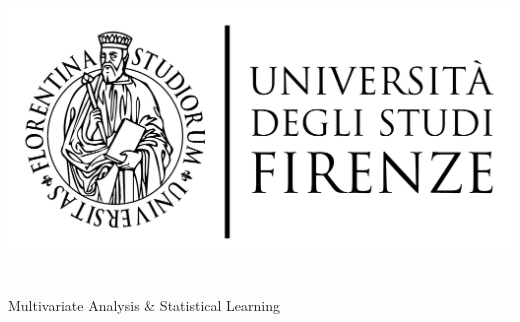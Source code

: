 \begin{titlepage}
	\begin{center}
   	\large
      \hfill
      \vfill
      \begingroup
         \includegraphics[scale=0.15]{logo/LOGO}\\
			\myFaculty \\
			\myDegree \\ 
			\vspace{0.5cm}
         \vspace{0.5cm}    
         Multivariate Analysis \& Statistical Learning
      \endgroup 
      \vfill 
      \begingroup
      	\spacedallcaps{\myItalianTitle} \\ $\ $\\
	\bigskip
      \endgroup
      \spacedlowsmallcaps{\myName}
      \vfill
      \vfill
      \vfill
      \myTime
      \vfill                      
	\end{center}        
\end{titlepage}